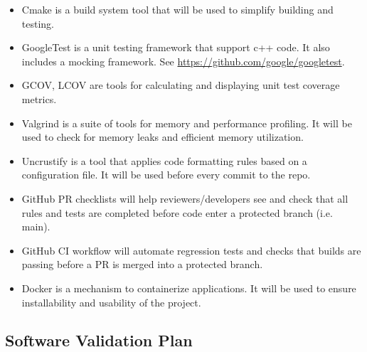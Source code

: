 \documentclass[12pt, titlepage]{article}
\begin{document}
\begin{itemize}
    \item Cmake \citep{cmake} is a build system tool that will be used to simplify building and
    testing.
    \item GoogleTest is a unit testing framework that support c++ code. It also includes a mocking
    framework. See \url{https://github.com/google/googletest}.
    \item GCOV, LCOV are tools for calculating and displaying unit test coverage metrics.
    \item Valgrind is a suite of tools for memory and performance profiling. It will be used to
    check for memory leaks and efficient memory utilization.
    \item Uncrustify is a tool that applies code formatting rules based on a configuration file. It
    will be used before every commit to the repo.
    \item GitHub PR checklists will help reviewers/developers see and check that all rules and tests
    are completed before code enter a protected branch (i.e. main).
    \item GitHub CI workflow will automate regression tests and checks that \progname{} builds are
    passing before a PR is merged into a protected branch.
    \item Docker is a mechanism to containerize applications. It will be used to ensure
    installability and usability of the project.
\end{itemize}




\subsection{Software Validation Plan}
\end{document}
